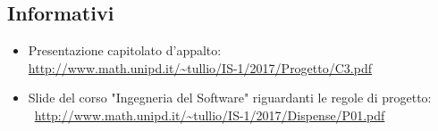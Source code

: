 \subsection{Informativi}
\begin{itemize}
	\item Presentazione capitolato d'appalto: \\ \url{http://www.math.unipd.it/~tullio/IS-1/2017/Progetto/C3.pdf}
	\item Slide del corso "Ingegneria del Software" riguardanti le regole di progetto: \\\ \url{http://www.math.unipd.it/~tullio/IS-1/2017/Dispense/P01.pdf}
\end{itemize}
